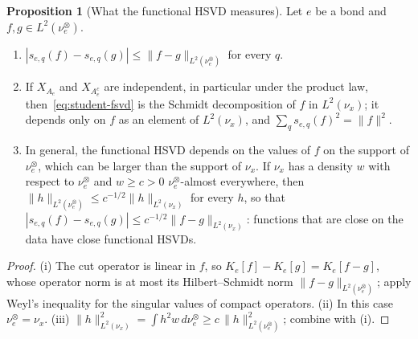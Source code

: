 \documentclass[11pt]{article}
\newcommand{\norm}[1]{\lVert #1\rVert}
\theoremstyle{definition}
\newtheorem{proposition}[theorem]{Proposition}
\numberwithin{equation}{section}
\begin{document}
\begin{proposition}[What the functional HSVD measures]\label{prop:fhsvd}
Let $e$ be a bond and $f,g\in L^2(\nu^\otimes_e)$.
\begin{enumerate}[label=(\roman*),nosep]
\item $|s_{e,q}(f)-s_{e,q}(g)|\le\norm{f-g}_{L^2(\nu^\otimes_e)}$ for every $q$.
\item If $X_{A_e}$ and $X_{A_e^c}$ are independent, in particular under the product law, then~\eqref{eq:student-fsvd} is the Schmidt decomposition of $f$ in $L^2(\nu_x)$; it depends only on $f$ as an element of $L^2(\nu_x)$, and $\sum_qs_{e,q}(f)^2=\norm f^2$.
\item In general, the functional HSVD depends on the values of $f$ on the support of $\nu^\otimes_e$, which can be larger than the support of $\nu_x$. If $\nu_x$ has a density $w$ with respect to $\nu^\otimes_e$ and $w\ge c>0$ $\nu^\otimes_e$-almost everywhere, then $\norm{h}_{L^2(\nu^\otimes_e)}\le c^{-1/2}\norm{h}_{L^2(\nu_x)}$ for every $h$, so that $|s_{e,q}(f)-s_{e,q}(g)|\le c^{-1/2}\norm{f-g}_{L^2(\nu_x)}$: functions that are close on the data have close functional HSVDs.
\end{enumerate}
\end{proposition}

\begin{proof}
(i) The cut operator is linear in $f$, so $K_e[f]-K_e[g]=K_e[f-g]$, whose operator norm is at most its Hilbert--Schmidt norm $\norm{f-g}_{L^2(\nu^\otimes_e)}$; apply Weyl's inequality for the singular values of compact operators. (ii) In this case $\nu^\otimes_e=\nu_x$. (iii) $\norm h^2_{L^2(\nu_x)}=\int h^2w\,d\nu^\otimes_e\ge c\,\norm h^2_{L^2(\nu^\otimes_e)}$; combine with (i).
\end{proof}
\end{document}
